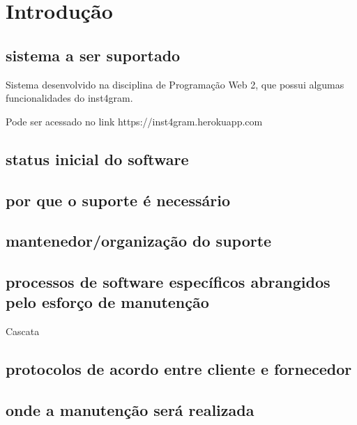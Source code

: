 \chapter{Introdução} 

\section{sistema a ser suportado}

Sistema desenvolvido na disciplina de Programação Web 2, que possui algumas funcionalidades do inst4gram.

Pode ser acessado no link https://inst4gram.herokuapp.com

\section{status inicial do software} 

\section{por que o suporte é necessário} 

\section{mantenedor/organização do suporte} 

\section{processos de software específicos abrangidos pelo esforço de manutenção} 

Cascata

\section{protocolos de acordo entre cliente e fornecedor}

\section{onde a manutenção será realizada}

